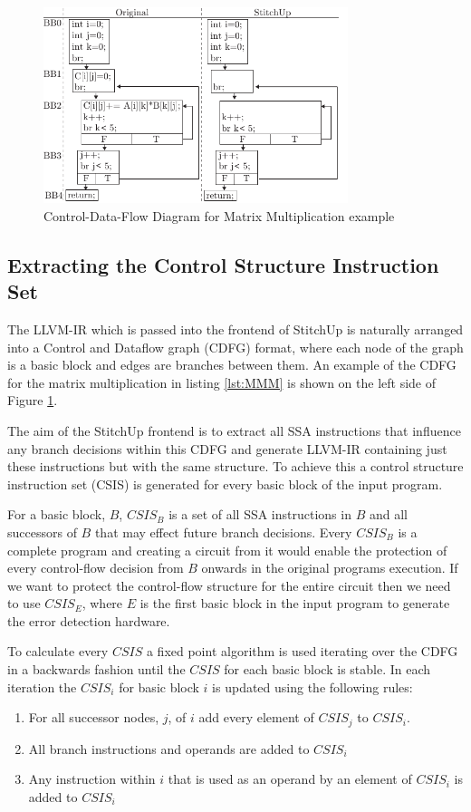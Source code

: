 \begin{figure}[h]
\centering
\includegraphics[width=3.5in]{./imgs/mmm_cdfg.pdf}
\caption{Control-Data-Flow Diagram for Matrix Multiplication example}
\label{fig:mmm_cdfg}
\end{figure}

\subsection{Extracting the Control Structure Instruction Set}
The LLVM-IR which is passed into the frontend of StitchUp is naturally arranged
into a Control and Dataflow graph (CDFG) format,
where each node of the graph is a basic block and edges are branches between them.
An example of the CDFG for the matrix multiplication in listing \ref{lst:MMM}
is shown on the left side of Figure \ref{fig:mmm_cdfg}.

The aim of the StitchUp frontend is to extract all SSA instructions that influence
any branch decisions within this CDFG and generate LLVM-IR containing just these
instructions but with the same structure.
To achieve this a control structure instruction set (CSIS) is generated for every basic
block of the input program.

For a basic block, $B$, $CSIS_{B}$ is a set of all SSA instructions in $B$ and
all successors of $B$ that may effect future branch decisions.
Every $CSIS_{B}$ is a complete program and creating a circuit from it would
enable the protection of every control-flow decision from $B$ onwards in the
original programs execution.
If we want to protect the control-flow structure for the entire circuit then
we need to use $CSIS_{E}$, where $E$ is the first basic block in the input program
to generate the error detection hardware.

To calculate every $CSIS$ a fixed point algorithm is used iterating over the CDFG
in a backwards fashion until the $CSIS$ for each basic block is stable.
In each iteration the $CSIS_{i}$ for basic block $i$ is
updated using the following rules:
\begin{enumerate}
    \item For all successor nodes, $j$, of $i$ add every element of $CSIS_j$ to $CSIS_i$.
    \item All branch instructions and operands are added to $CSIS_i$
    \item Any instruction within $i$ that is used as an operand by an element of $CSIS_i$ is added to $CSIS_i$
\end{enumerate}

